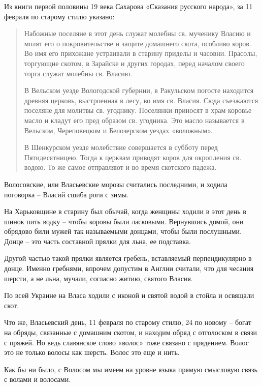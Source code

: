    Из книги первой половины 19 века Сахарова «Сказания русского народа», за 11 февраля по старому стилю указано:

\begin{quotation}
Набожные поселяне в этот день служат молебны св. мученику Власию и молят его о покровительстве и защите домашнего скота, особливо коров. Во имя его прихожане устраивали в старину приделы и часовни. Прасолы, торгующие скотом, в Зарайске и других городах, перед началом своего торга служат молебны св. Власию. 

В Вельском уезде Вологодской губернии, в Ракульском погосте находится древняя церковь, выстроенная в лесу, во имя св. Власия. Сюда съезжаются поселяне для молитвы св. угоднику. Поселянки приносят в храм коровье масло и кладут его пред образом св. угодника. Это масло называется в Вельском, Череповецком и Белозерском уездах «воложным». 

В Шенкурском уезде молебствие совершается в субботу перед Пятидесятницею. Тогда к церквам приводят коров для окропления св. водою. То же самое отправляют и во время скотского падежа.
\end{quotation}

   Волосовские, или Власьевские морозы считались последними, и ходила поговорка – Власий сшиба роги с зимы.

   На Харьковщине в старину был обычай, когда женщины ходили в этот день в шинок пить водку – чтобы коровы были ласковыми. Вернувшись домой, они обрядово били мужей так называемыми донцами, чтобы были послушными. Донце – это часть составной прялки для льна, ее подставка.


   Другой частью такой прялки является гребень, вставляемый перпендикулярно в донце. Именно гребнями, впрочем допустим в Англии считали, что для чесания шерсти, а не льна, мучали, согласно житию, святого Власия.

   По всей Украине на Власа ходили с иконой и святой водой в стойла и освящали скот.

   Что же, Власьевский день, 11 февраля по старому стилю, 24 по новому – богат на обряды, связанные с домашним скотом, и находим обряд с отголоском в связи с пряжей. Но ведь славянское слово «волос» тоже связано с прядением. Волос это не только волосы как шерсть. Волос это еще и нить.

   Как бы ни было, с Волосом мы имеем на уровне языка прямую смысловую связь с волами и волосами.

